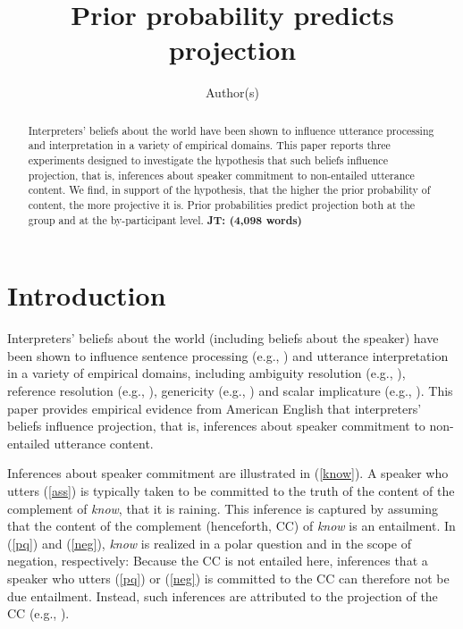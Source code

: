 \documentclass[11pt,fleqn]{article}
\title{Prior probability predicts projection}
\author{Author(s)}
\newcommand{\6}{\mbox{$[\hspace*{-.6mm}[$}}
\newcommand{\9}{\mbox{$]\hspace*{-.6mm}]$}}
\newcommand{\jt}[1]{\textbf{\color{blue}JT: #1}}
\begin{document}

\maketitle

\begin{abstract}

Interpreters' beliefs about the world have been shown to influence utterance processing and interpretation in a variety of empirical domains. This paper reports three experiments designed to investigate the hypothesis that such beliefs influence projection, that is, inferences about speaker commitment to non-entailed utterance content. We find, in support of the hypothesis, that the higher the prior probability of content, the more projective it is. Prior probabilities predict projection both at the group and at the by-participant level. \jt{(4,098 words)}

\end{abstract}


\section{Introduction}

Interpreters' beliefs about the world (including beliefs about the speaker) have been shown to influence sentence processing (e.g., \citealt{chambers-etal02,hagoort-etal2004,hald-etal2007}) and utterance interpretation in a variety of empirical domains, including ambiguity resolution (e.g., \citealt{chambers-etal04,bicknell-rohde2009}), reference resolution (e.g., \citealt{hanna-tanenhaus04}), genericity (e.g., \citealt{tessler-goodman2019}) and scalar implicature (e.g., \citealt{degen-etal2015}). This paper provides empirical evidence from American English that interpreters' beliefs influence projection, that is, inferences about speaker commitment to non-entailed utterance content.

Inferences about speaker commitment are illustrated in (\ref{know}). A speaker who utters (\ref{ass}) is typically taken to be committed to the truth of the content of the complement of {\em know}, that it is raining. This inference is captured by assuming that the content of the complement (henceforth, CC) of {\em know} is an entailment. In (\ref{pq}) and (\ref{neg}), {\em know} is realized in a polar question and in the scope of negation, respectively: Because the CC is not entailed here, inferences that a speaker who utters (\ref{pq}) or (\ref{neg}) is committed to the CC can therefore not be due entailment. Instead, such inferences are attributed to the projection of the CC (e.g., \citealt{langendoen-savin71,beaver-geurts-sep}).
\end{document}
